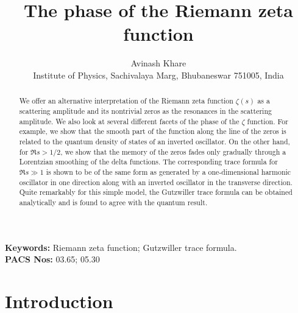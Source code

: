 \documentclass[11pt]{article}
\title{The phase of the Riemann zeta function}
\author{Avinash Khare\\
Institute of Physics, Sachivalaya Marg, Bhubaneswar 751005, India}
\date{}
\theoremstyle{plain}
\begin{document}
\maketitle

\begin{abstract}
We offer an alternative interpretation of the Riemann zeta function $\zeta(s)$ as a scattering amplitude and its nontrivial zeros as the resonances in the scattering amplitude. We also look at several different facets of the phase of the $\zeta$ function. For example, we show that the smooth part of the function along the line of the zeros is related to the quantum density of states of an inverted oscillator. On the other hand, for $\Re s > 1/2$, we show that the memory of the zeros fades only gradually through a Lorentzian smoothing of the delta functions. The corresponding trace formula for $\Re s \gg 1$ is shown to be of the same form as generated by a one-dimensional harmonic oscillator in one direction along with an inverted oscillator in the transverse direction. Quite remarkably for this simple model, the Gutzwiller trace formula can be obtained analytically and is found to agree with the quantum result.
\end{abstract}

\textbf{Keywords:} Riemann zeta function; Gutzwiller trace formula.\\
\textbf{PACS Nos:} 03.65; 05.30

\section{Introduction}
\end{document}
